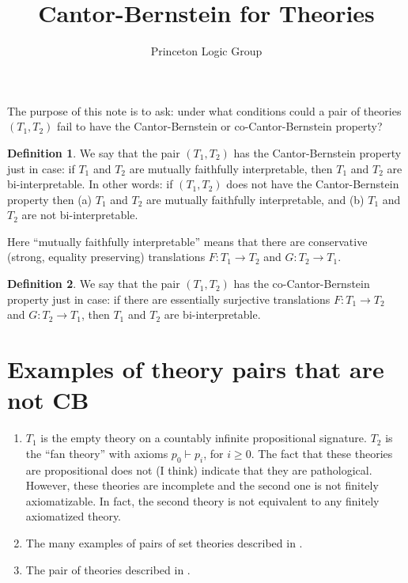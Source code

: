 \documentclass[12pt]{article}
\title{Cantor-Bernstein for Theories}
\author{Princeton Logic Group}
\theoremstyle{definition}
\newtheorem*{defn}{Definition}
\begin{document}



\maketitle

The purpose of this note is to ask: under what conditions could a pair
of theories $(T_1,T_2)$ fail to have the Cantor-Bernstein or
co-Cantor-Bernstein property?

\begin{defn} We say that the pair $(T_1,T_2)$ has the Cantor-Bernstein
  property just in case: if $T_1$ and $T_2$ are mutually faithfully
  interpretable, then $T_1$ and $T_2$ are bi-interpretable. In other
  words: if $(T_1,T_2)$ does not have the Cantor-Bernstein property
  then (a) $T_1$ and $T_2$ are mutually faithfully interpretable, and
  (b) $T_1$ and $T_2$ are not bi-interpretable. \end{defn}

Here ``mutually faithfully interpretable'' means that there are
conservative (strong, equality preserving) translations $F:T_1\to T_2$
and $G:T_2\to T_1$.

\begin{defn} We say that the pair $(T_1,T_2)$ has the
  co-Cantor-Bernstein property just in case: if there are essentially
  surjective translations $F:T_1\to T_2$ and $G:T_2\to T_1$, then
  $T_1$ and $T_2$ are bi-interpretable. \end{defn}


\section{Examples of theory pairs that are not CB}


\begin{enumerate}
\item $T_1$ is the empty theory on a countably infinite propositional
  signature. $T_2$ is the ``fan theory'' with axioms $p_0\vdash p_i$,
  for $i\geq 0$. The fact that these theories are propositional does
  not (I think) indicate that they are pathological. However, these
  theories are incomplete and the second one is not finitely
  axiomatizable. In fact, the second theory is not equivalent to any
  finitely axiomatized theory.
\item The many examples of pairs of set theories described in \citep[p
  8]{hamkins}.
\item The pair of theories described in \citep{andreka}.
\end{enumerate}
\end{document}

